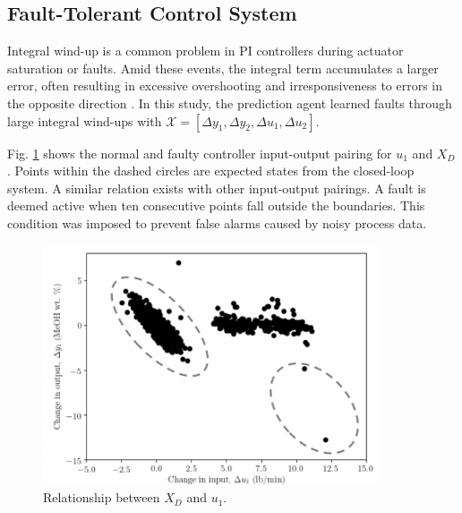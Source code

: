 \subsection{Fault-Tolerant Control System}
Integral wind-up is a common problem in PI controllers during actuator saturation or faults.  Amid these events, the integral term accumulates a larger error, often resulting in excessive overshooting and irresponsiveness to errors in the opposite direction \cite{process_control_ref13}. In this study, the prediction agent learned faults through large integral wind-ups with ${\mathcal{X}} = [\Delta y_1, \Delta y_2, \Delta u_1, \Delta u_2]$.

Fig. \ref{fig:FDS} shows the normal and faulty controller input-output pairing for $u_1$ and $X_D$. Points within the dashed circles are expected states from the closed-loop system. A similar relation exists with other input-output pairings. A fault is deemed active when ten consecutive points fall outside the boundaries. This condition was imposed to prevent false alarms caused by noisy process data.
\begin{figure}[h]
    \begin{center}
        \includegraphics[width=10cm]{images/ftc/Boundaries.png}
        \caption{\label{fig:FDS} Relationship between $X_D$ and $u_1$.}
    \end{center}
\end{figure}

